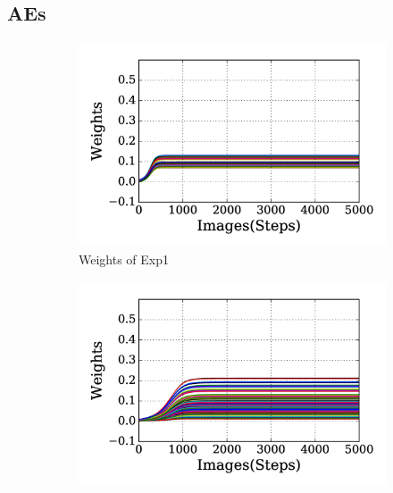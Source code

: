 \DIFdelbegin %
\DIFdelend \DIFaddbegin \subsection[AEs]{\DIFaddend AEs\DIFdelbegin \DIFdel{)}\DIFdelend }
\label{subsec:exp_AE}
\begin{figure}
	\centering
	\begin{subfigure}[t]{0.48\textwidth}
		\includegraphics[width=\textwidth]{pics_sdlm/20_exp_AE/exp1_weights_non.png}
		\caption{Weights of Exp1}
	\end{subfigure}
	\begin{subfigure}[t]{0.48\textwidth}
		\includegraphics[width=\textwidth]{pics_sdlm/20_exp_AE/exp2_weights_non.png}

\end{subfigure}
\end{figure}
